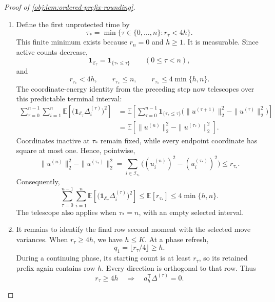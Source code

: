 \documentclass[11pt]{article}
\begin{document}
\begin{proof}[Proof of \cref{obj:lem:ordered-prefix-rounding}]
\begin{enumerate}
\item
Define the first unprotected time by
\[
\tau_*=\min\{\tau\in\{0,\ldots,n\}:r_\tau<4h\}.
\]
This finite minimum exists because \(r_n=0\) and \(h\geq1\). It is measurable. Since active counts decrease,
\[
\mathbf1_{\mathcal E_\tau}
=\mathbf1_{\{\tau_*\leq\tau\}}
\qquad(0\leq\tau<n),
\]
and
\[
r_{\tau_*}<4h,\qquad
r_{\tau_*}\leq n,\qquad
r_{\tau_*}\leq4\min\{h,n\}.
\]
The coordinate-energy identity from the preceding step now telescopes over this predictable terminal interval:
\[
\begin{aligned}
\sum_{\tau=0}^{n-1}\sum_{i=1}^n
\mathbb E\!\left[
\bigl(\mathbf1_{\mathcal E_\tau}\Delta_i^{(\tau)}\bigr)^2
\right]
&=
\mathbb E\!\left[
\sum_{\tau=0}^{n-1}
\mathbf1_{\{\tau_*\leq\tau\}}
\bigl(\|u^{(\tau+1)}\|_2^2-\|u^{(\tau)}\|_2^2\bigr)
\right]\\
&=
\mathbb E\!\left[\|u^{(n)}\|_2^2-\|u^{(\tau_*)}\|_2^2\right].
\end{aligned}
\]
Coordinates inactive at \(\tau_*\) remain fixed, while every endpoint coordinate has square at most one. Hence, pointwise,
\[
\|u^{(n)}\|_2^2-\|u^{(\tau_*)}\|_2^2
=
\sum_{i\in\mathcal I_{\tau_*}}
\bigl((u_i^{(n)})^2-(u_i^{(\tau_*)})^2\bigr)
\leq r_{\tau_*}.
\]
Consequently,
\[
\sum_{\tau=0}^{n-1}\sum_{i=1}^n
\mathbb E\!\left[
\bigl(\mathbf1_{\mathcal E_\tau}\Delta_i^{(\tau)}\bigr)^2
\right]
\leq\mathbb E[r_{\tau_*}]
\leq4\min\{h,n\}.
\]
The telescope also applies when \(\tau_*=n\), with an empty selected interval.

\item
It remains to identify the final row second moment with the selected move variances. When \(r_\tau\geq4h\), we have \(h\leq K\). At a phase refresh,
\[
q_1=\lfloor r_\tau/4\rfloor\geq h.
\]
During a continuing phase, its starting count is at least \(r_\tau\), so its retained prefix again contains row \(h\). Every direction is orthogonal to that row. Thus
\[
r_\tau\geq4h
\quad\Longrightarrow\quad
a_h^{\mathsf T}\Delta^{(\tau)}=0.
\]


\end{enumerate}
\end{proof}
\end{document}
